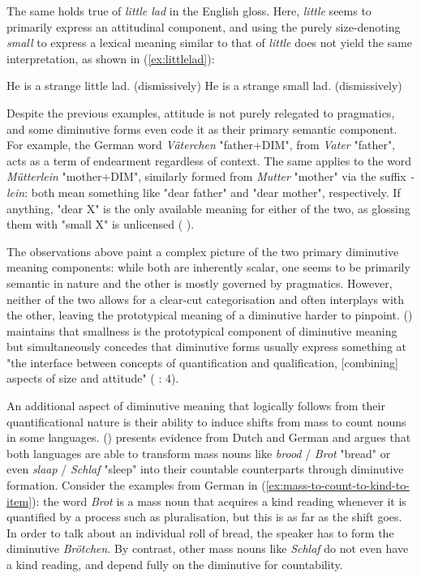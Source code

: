 The same holds true of \textit{little lad} in the English gloss. Here, \textit{little} seems to primarily express an attitudinal component, and using the purely size-denoting \textit{small} to express a lexical meaning similar to that of \textit{little} does not yield the same interpretation, as shown in (\ref{ex:littlelad}):

\begin{exe}
\ex \label{ex:littlelad}
\begin{xlist}
\ex He is a strange little lad. (dismissively)
\ex *He is a strange small lad. (dismissively)
\end{xlist}
\end{exe}

Despite the previous examples, attitude is not purely relegated to pragmatics, and some diminutive forms even code it as their primary semantic component. For example, the German word \textit{Väterchen} "father+DIM", from \textit{Vater} "father", acts as a term of endearment regardless of context. The same applies to the word \textit{Mütterlein} "mother+DIM", similarly formed from \textit{Mutter} "mother" via the suffix \textit{-lein}: both mean something like "dear father" and "dear mother", respectively. If anything, "dear X" is the only available meaning for either of the two, as glossing them with "small X" is unlicensed  (\citeauthor{Schneider+2003} \citeyear{Schneider+2003}).

The observations above paint a complex picture of the two primary diminutive meaning components: while both are inherently scalar, one seems to be primarily semantic in nature and the other is mostly governed by pragmatics. However, neither of the two allows for a clear-cut categorisation and often interplays with the other, leaving the prototypical meaning of a diminutive harder to pinpoint. \citeauthor{Schneider+2003} (\citeyear{Schneider+2003}) maintains that smallness is the prototypical component of diminutive meaning but simultaneously concedes that diminutive forms usually express something at "the interface between concepts of quantification and qualification, [combining] aspects of size and attitude" (\citeauthor{Schneider+2003} \citeyear{Schneider+2003}: 4).

An additional aspect of diminutive meaning that logically follows from their quantificational nature is their ability to induce shifts from mass to count nouns in some languages. \citeauthor{Wiltschko+2006} (\citeyear{Wiltschko+2006}) presents evidence from Dutch and German and argues that both languages are able to transform mass nouns like \textit{brood} / \textit{Brot} "bread" or even \textit{slaap} / \textit{Schlaf} "sleep" into their countable counterparts through diminutive formation. Consider the examples from German in (\ref{ex:mass-to-count-to-kind-to-item}): the word \textit{Brot} is a mass noun that acquires a kind reading whenever it is quantified by a process such as pluralisation, but this is as far as the shift goes. In order to talk about an individual roll of bread, the speaker has to form the diminutive \textit{Brötchen}. By contrast, other mass nouns like \textit{Schlaf} do not even have a kind reading, and depend fully on the diminutive for countability.

